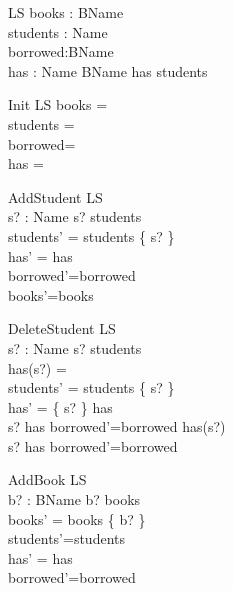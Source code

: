 

\begin{zed}
\end{zed}

\begin{schema}{LS}
 books : \power BName \\
 students : \power Name \\
 borrowed:\power BName\\
 has : Name \pfun \power BName 
\where
 \dom has \subseteq students
\end{schema}

\begin{schema}{Init}
 LS
\where
 books =~\emptyset \\
 students =~\emptyset \\
 borrowed=~\emptyset \\
 has =~\emptyset

\end{schema}

\begin{schema}{AddStudent}
 \Delta LS \\
 s? : Name 
\where
 s? \notin students \\
 students' = students \cup \{ s? \} \\
 has' = has\\
 borrowed'=borrowed\\
 books'=books
\end{schema}

\begin{schema}{DeleteStudent}
 \Delta LS \\
 s? : Name 
\where
 s? \in students \\
 has(s?) = \emptyset \\
 students' = students \setminus \{ s? \} \\
 has' = \{ s? \} \ndres has\\
 s?  \in \dom  has \implies borrowed'=borrowed \setminus has(s?)\\
 s?  \notin \dom  has \implies borrowed'=borrowed
\end{schema}

\begin{schema}{AddBook}
 \Delta LS \\
 b? : BName
\where
 b? \notin books \\
 books' = books \cup \{ b? \} \\
 students'=students\\
 has' = has\\
 borrowed'=borrowed
\end{schema}

